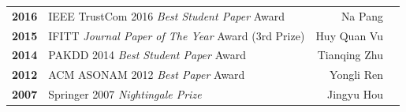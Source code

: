 \documentclass{tikzposter} %
\begin{document}
\begin{columns}
{\begin{minipage}{\linewidth}
\begin{tabular}{ r | l | r  r }
\textbf{2016} & IEEE TrustCom 2016 \textit{Best Student Paper} Award & Na Pang &  \\

\textbf{2015} & IFITT \textit{Journal Paper of The Year} Award (3rd Prize) & Huy Quan Vu &  \\

\textbf{2014} & PAKDD 2014 \textit{Best Student Paper} Award & Tianqing Zhu &  \\

\textbf{2012} & ACM ASONAM 2012  \textit{Best Paper} Award & Yongli Ren &  \\

\textbf{2007} & Springer 2007 \textit{Nightingale Prize} & Jingyu Hou &  \\
\bottomrule
\end{tabular}
\end{minipage}
}



\end{columns}
\end{document}
